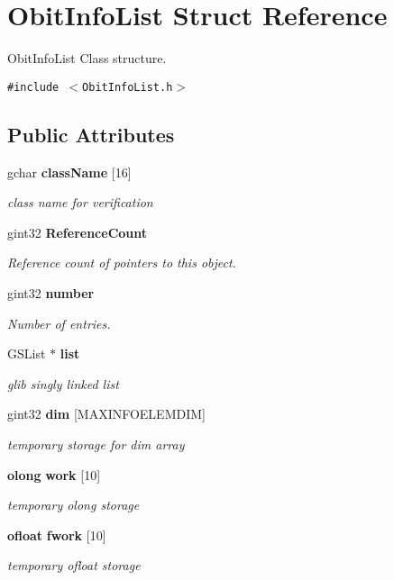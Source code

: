 \section{Obit\-Info\-List Struct Reference}
\label{structObitInfoList}
Obit\-Info\-List Class structure.  


{\tt \#include $<$Obit\-Info\-List.h$>$}

\subsection*{Public Attributes}
\begin{CompactItemize}
\item 
gchar {\bf class\-Name} [16]
\begin{CompactList}\small\item\em class name for verification \item\end{CompactList}\item 
gint32 {\bf Reference\-Count}
\begin{CompactList}\small\item\em Reference count of pointers to this object. \item\end{CompactList}\item 
gint32 {\bf number}
\begin{CompactList}\small\item\em Number of entries. \item\end{CompactList}\item 
GSList $\ast$ {\bf list}
\begin{CompactList}\small\item\em glib singly linked list \item\end{CompactList}\item 
gint32 {\bf dim} [MAXINFOELEMDIM]
\begin{CompactList}\small\item\em temporary storage for dim array \item\end{CompactList}\item 
{\bf olong} {\bf work} [10]
\begin{CompactList}\small\item\em temporary olong storage \item\end{CompactList}\item 
{\bf ofloat} {\bf fwork} [10]
\begin{CompactList}\small\item\em temporary ofloat storage \item\end{CompactList}\end{CompactItemize}


